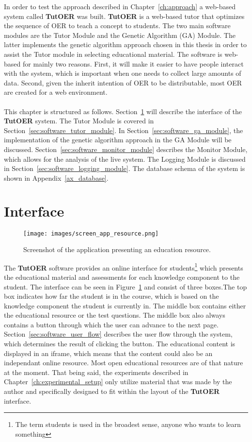 In order to test the approach described in Chapter~\ref{ch:approach} a
web-based system called \textbf{TutOER} was built. \textbf{TutOER} is a web-based tutor
that optimizes the sequence of OER to teach a concept to students.
The two main software modules are the Tutor Module and the Genetic Algorithm
(GA) Module. The latter implements the genetic algorithm approach chosen in
this thesis in order to assist the Tutor module in selecting educational
material. The software is web-based for mainly two reasons. First, it will make
it easier to have people interact with the system, which is important when one
needs to collect large amounts of data. Second, given the inherit intention of
OER to be distributable, most OER are created for a web environment.\\\\
\noindent
This chapter is structured as follows. Section~\ref{sec:software_interface} will
describe the interface of the \textbf{TutOER} system. The Tutor Module is covered in
Section~\ref{sec:software_tutor_module}. In
Section~\ref{sec:software_ga_module}, the implementation of the genetic
algorithm approach in the GA Module will be discussed.
Section~\ref{sec:software_monitor_module} describes the Monitor Module, which
allows for the analysis of the live system. The Logging Module is discussed in
Section~\ref{sec:software_logging_module}. The database schema of the system is
shown in Appendix~\ref{ax_database}.
\section{Interface}
\label{sec:software_interface}
\begin{figure}[ht!]
	\centering
	\texttt{[image: images/screen\_app\_resource.png]}
	\caption[Application screenshot - Resource]{Screenshot of the application
	presenting an education resource.}
	\label{fig:screen_app_resource}
\end{figure}
The \textbf{TutOER} software provides an online interface for
students\footnote{The term students is used in the broadest sense, anyone who
wants to learn something} which presents the educational material and
assessments for each knowledge component to the student. The interface can be
seen in Figure~\ref{fig:screen_app_resource} and consist of three boxes.The
top box indicates how far the student is in the course, which is based on
the knowledge component the student is currently in. The middle box contains
either the educational resource or the test questions.
The middle box also always contains a button through which the user can advance
to the next page. Section~\ref{sec:software_user_flow} describes the user flow
through the system, which determines the result of clicking the button. The
educational content is displayed in an iframe, which means that the content
could also be an independant online resource. Most open educational resources
are of that nature at the moment. That being said, the experiments described in
Chapter~\ref{ch:experimental_setup} only utilize material that was made by the
author and specifically designed to fit within the layout of the \textbf{TutOER}
interface.
